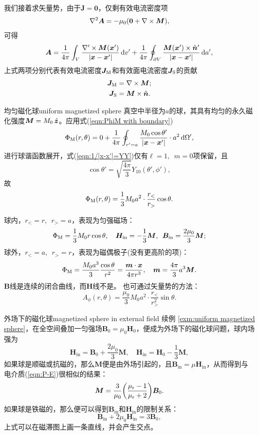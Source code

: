 我们接着求矢量势，由于$\bm J=\bm 0$，仅剩有效电流密度项
\begin{equation}
    \nabla^2\bm A=-\mu_0(\bm 0+\nabla\times\bm M),
\end{equation}
可得
\begin{equation}
    \label{eqn:A with boundary}
    \bm A=\frac1{4\pi}\int_V\frac{\nabla'\times\bm M(\bm x')}{|\bm x-\bm x'|}\mathop{}\!\mathrm{d} v'+\frac1{4\pi}\oint_{\partial V}\frac{\bm M(\bm x')\times\mathop{}\!\hat{\bm n}'}{|\bm x-\bm x'|}\mathop{}\!\mathrm{d} a',
\end{equation}
上式两项分别代表有效电流密度$\bm J_\text M$和有效面电流密度$\bm J_\text S$的贡献
\begin{align}
    \bm J_\text M&=\nabla\times\bm M;\\
    \bm J_\text S&=\bm M\times\mathop{}\!\hat{\bm n}.
\end{align}
\begin{example}{均匀磁化球}{uniform magnetized sphere}
    真空中半径为$a$的球，其具有均匀的永久磁化强度$\bm M=M_0\mathop{}\!\hat{\bm z}$。应用式(\ref{eqn:PhiM with boundary})
    \[
        \Phi_\text M(r,\theta)=0+\frac1{4\pi}\oint_{r'=a}\frac{M_0\cos\theta'}{|\bm x-\bm x'|}\cdot a^2\mathop{}\!\mathrm{d}\Omega',
    \]
    进行球谐函数展开，式(\ref{eqn:1/|x-x'|=YY})仅有$\ell=1,\enspace m=0$项保留，且
    \[
        \cos\theta'=\sqrt{\frac{4\pi}3}Y_{10}(\theta',\phi'),
    \]
    故
    \[
        \Phi_\text M(r,\theta)=\frac13M_0a^2\cdot\frac{r_<}{r_>}\cos\theta.
    \]

    球内，$r_<=r,\enspace r_>=a$，表现为匀强磁场：
    \[
        \Phi_\text M=\frac13M_0r\cos\theta,\quad \bm H_\text{in}=-\frac13\bm M,\enspace\bm B_\text{in}=\frac{2\mu_0}3\bm M;
    \]
    球外，$r_<=a,\enspace r_>=r$，表现为磁偶极子(没有更高阶的项)：
    \[
        \Phi_\text M=\frac{M_0a^3}3\frac{\cos\theta}{r^2}=\frac{\bm m\cdot\bm x}{4\pi r^3},\quad\bm m=\frac{4\pi}3a^3\bm M.
    \]
    $\bm B$线是连续的闭合曲线，而$\bm H$线不是。
    \tcblower
    也可通过矢量势的方法：
    \[
        A_\phi(r,\theta)=\frac{\mu_0}3M_0a^2\cdot\frac{r_<}{r_>^2}\sin\theta.
    \]
\end{example}
\begin{example}{外场下的磁化球}{magnetized sphere in external field}
    续例 \ref{exm:uniform magnetized sphere}，在全空间叠加一匀强场$\bm B_0=\mu_0\bm H_0$，便成为外场下的磁化球问题，球内场强为
    \[
        \bm H_\text{in}=\bm B_0+\frac{2\mu_0}3\bm M,\quad\bm H_\text{in}=\bm H_0-\frac13\bm M,
    \]
    如果球是顺磁或抗磁的，那么$\bm M$便是由外场引起的，且$\bm B_\text{in}=\mu\bm H_\text{in}$，从而得到与电介质(\ref{eqn:P-E})很相似的结果：
    \begin{equation}
        \label{eqn:M-B}
        \bm M=\frac3{\mu_0}\biggl(\frac{\mu_\text r-1}{\mu_\text r+2}\biggr)\bm B_0.
    \end{equation}
    如果球是铁磁的，那么便可以得到$\bm B_\text{in}$和$\bm H_\text{in}$的限制关系：
    \[
        \bm B_\text{in}+2\mu_0\bm H_\text{in}=3\bm B_0,
    \]
    上式可以在磁滞图上画一条直线，并会产生交点。
\end{example}
